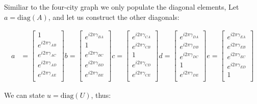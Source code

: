 \documentclass[msc,oneside]{ubcthesis}
\begin{document}
	 Similiar to the four-city graph we only populate the diagonal elements, Let $ a = \mathrm{diag}(A)$, and let us construct the other diagonals:
	
	\begin{align*}	
		a & = \begin{bmatrix}
			1 \\
			e^{i2\pi\gamma_{AB}} \\
			e^{i2\pi\gamma_{AC}} \\
			e^{i2\pi\gamma_{AD}} \\
			e^{i2\pi\gamma_{AE}} \\
		\end{bmatrix} 
		b  = \begin{bmatrix}
			e^{i2\pi\gamma_{BA}} \\
			1 \\
			e^{i2\pi\gamma_{BC}} \\
			e^{i2\pi\gamma_{BD}} \\
			e^{i2\pi\gamma_{BE}} \\
		\end{bmatrix}
		c  = \begin{bmatrix}
			e^{i2\pi\gamma_{CA}} \\
			e^{i2\pi\gamma_{CB}} \\
			1 \\
			e^{i2\pi\gamma_{CD}} \\
			e^{i2\pi\gamma_{CE}} \\
		\end{bmatrix} 
		d = \begin{bmatrix}
			e^{i2\pi\gamma_{DA}} \\
			e^{i2\pi\gamma_{DB}} \\
			e^{i2\pi\gamma_{DC}} \\
			1 \\
			e^{i2\pi\gamma_{DE}} \\
		\end{bmatrix}  
		e = \begin{bmatrix}
			e^{i2\pi\gamma_{EA}} \\
			e^{i2\pi\gamma_{EB}} \\
			e^{i2\pi\gamma_{EC}} \\
			e^{i2\pi\gamma_{ED}} \\
			1 \\
		\end{bmatrix}		 			
	\end{align*}
	

	
	We can state $ u = \mathrm{diag}(U)$, thus:
	
\end{document}
